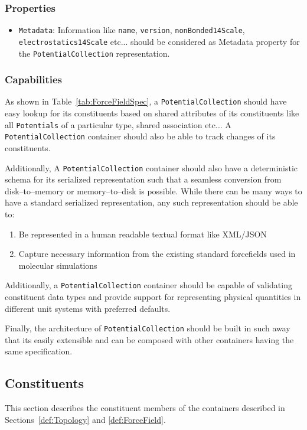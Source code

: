\documentclass[12pt]{article}
\begin{document}
\subsubsection{Properties}
\begin{itemize}
    \item \texttt{Metadata}: Information like \texttt{name}, \texttt{version}, \texttt{nonBonded14Scale}, \texttt{electrostatics14Scale} etc...  should be considered as Metadata property for the \texttt{PotentialCollection} representation.
\end{itemize}

\subsubsection{Capabilities}
As shown in Table~\ref{tab:ForceFieldSpec}, a  \texttt{PotentialCollection} should have easy lookup for its constituents based on shared attributes of its constituents like all \texttt{Potentials} of a particular type, shared association etc... A \texttt{PotentialCollection} container should also be able to track changes of its constituents.

Additionally, A \texttt{PotentialCollection} container should also have a deterministic schema for  its  serialized  representation  such  that  a  seamless  conversion  from  disk–to–memory  or memory–to–disk is possible. While there can be many ways to have a standard serialized representation, any such representation should be able to:

\begin{enumerate}
    \item Be represented in a human readable textual format like XML/JSON
    \item Capture necessary information from the existing standard forcefields used in molecular simulations
\end{enumerate}

Additionally, a \texttt{PotentialCollection} container should be capable of validating constituent data types and provide support for representing physical quantities in different unit systems with preferred defaults.

Finally, the architecture of \texttt{PotentialCollection} should be built in such away that its easily extensible and can be composed with other containers having the same specification.

\subsection{Constituents}
This section describes the constituent members of the containers described in Sections~\ref{def:Topology} and \ref{def:ForceField}.
\end{document}
